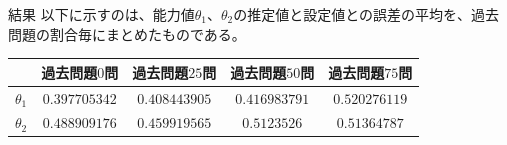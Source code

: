 \documentclass[aspectratio=169, dvipdfmx, 12pt]{beamer}
\begin{document}
\begin{frame}
  \begin{block}{結果}
    以下に示すのは、能力値$\theta_1$、$\theta_2$の推定値と設定値との誤差の平均を、過去問題の割合毎にまとめたものである。
    \begin{table}[H]
      \begin{center}
        \begin{tabular}{|c||c|c|c|c|} \hline
          & 過去問題$0$問& 過去問題$25$問 & 過去問題$50$問 & 過去問題$75$問\\ \hline \hline
          $\theta_1$ & $0.397705342$	& $0.408443905$	& $0.416983791$	& $0.520276119$ \\ \hline
          $\theta_2$ & $0.488909176$	& $0.459919565$	& $0.5123526$	& $0.51364787$ \\ \hline
        \end{tabular}
      \end{center}
    \end{table}
  \end{block}
\end{frame}
\end{document}
